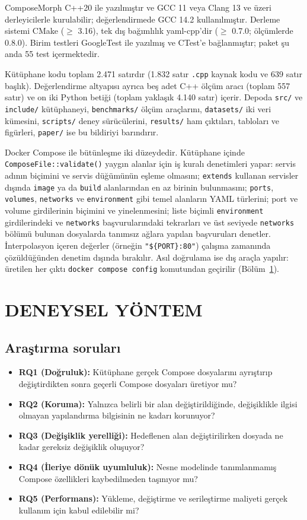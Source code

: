 \documentclass[12pt,a4paper]{article}
\begin{document}
ComposeMorph C++20 ile yazılmıştır ve GCC 11 veya Clang 13 ve üzeri
derleyicilerle kurulabilir; değerlendirmede GCC 14.2 kullanılmıştır.
Derleme sistemi CMake (\(\geq\) 3.16), tek dış bağımlılık
yaml-cpp'dir (\(\geq\) 0.7.0; ölçümlerde 0.8.0). Birim testleri
GoogleTest ile yazılmış ve CTest'e bağlanmıştır; paket şu anda 55 test
içermektedir.

Kütüphane kodu toplam 2.471 satırdır (1.832 satır \texttt{.cpp} kaynak
kodu ve 639 satır başlık). Değerlendirme altyapısı ayrıca beş adet C++ ölçüm aracı
(toplam 557 satır) ve on iki Python betiği (toplam yaklaşık 4.140 satır)
içerir. Depoda \texttt{src/} ve
\texttt{include/} kütüphaneyi, \texttt{benchmarks/} ölçüm araçlarını,
\texttt{datasets/} iki veri kümesini, \texttt{scripts/} deney
sürücülerini, \texttt{results/} ham çıktıları, tabloları ve figürleri,
\texttt{paper/} ise bu bildiriyi barındırır.

Docker Compose ile bütünleşme iki düzeydedir. Kütüphane içinde
\texttt{ComposeFile::validate()} yaygın alanlar için iş kuralı denetimleri
yapar: servis adının biçimini ve servis düğümünün eşleme olmasını;
\texttt{extends} kullanan servisler dışında \texttt{image} ya da
\texttt{build} alanlarından en az birinin bulunmasını; \texttt{ports},
\texttt{volumes}, \texttt{networks} ve \texttt{environment} gibi temel
alanların YAML türlerini; port ve volume girdilerinin biçimini ve
yinelenmesini; liste biçimli \texttt{environment} girdilerindeki ve
\texttt{networks} başvurularındaki tekrarları ve üst seviyede
\texttt{networks} bölümü bulunan dosyalarda tanımsız ağlara yapılan
başvuruları denetler. İnterpolasyon içeren değerler (örneğin
\texttt{"\$\{PORT\}:80"}) çalışma zamanında çözüldüğünden denetim dışında
bırakılır. Asıl doğrulama ise dış araçla yapılır: üretilen her
çıktı \texttt{docker compose config} komutundan geçirilir
(Bölüm~\ref{sec:yontem}).

\section{DENEYSEL YÖNTEM}
\label{sec:yontem}

\subsection{Araştırma soruları}
\begin{itemize}
  \item \textbf{RQ1 (Doğruluk):} Kütüphane gerçek Compose dosyalarını ayrıştırıp değiştirdikten sonra geçerli Compose dosyaları üretiyor mu?
  \item \textbf{RQ2 (Koruma):} Yalnızca belirli bir alan değiştirildiğinde, değişiklikle ilgisi olmayan yapılandırma bilgisinin ne kadarı korunuyor?
  \item \textbf{RQ3 (Değişiklik yerelliği):} Hedeflenen alan değiştirilirken dosyada ne kadar gereksiz değişiklik oluşuyor?
  \item \textbf{RQ4 (İleriye dönük uyumluluk):} Nesne modelinde tanımlanmamış Compose özellikleri kaybedilmeden taşınıyor mu?
  \item \textbf{RQ5 (Performans):} Yükleme, değiştirme ve serileştirme maliyeti gerçek kullanım için kabul edilebilir mi?
\end{itemize}
\end{document}
